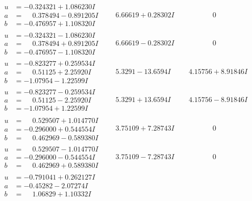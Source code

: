 \documentclass[1p]{elsarticle_modified}
\theoremstyle{definition}
\begin{document}
$$\begin{array}{c|c|c}
\begin{aligned}
u &= -0.324321 + 1.086230 I \\
a &= \phantom{-}0.378494 - 0.891205 I \\
b &= -0.476957 + 1.108320 I\end{aligned}
 & \phantom{-}6.66619 + 0.28302 I & \phantom{-0.000000 } 0 \\ \hline\begin{aligned}
u &= -0.324321 - 1.086230 I \\
a &= \phantom{-}0.378494 + 0.891205 I \\
b &= -0.476957 - 1.108320 I\end{aligned}
 & \phantom{-}6.66619 - 0.28302 I & \phantom{-0.000000 } 0 \\ \hline\begin{aligned}
u &= -0.823277 + 0.259534 I \\
a &= \phantom{-}0.51125 + 2.25920 I \\
b &= -1.07954 - 1.22599 I\end{aligned}
 & \phantom{-}5.3291 - 13.6594 I & \phantom{-}4.15756 + 8.91846 I \\ \hline\begin{aligned}
u &= -0.823277 - 0.259534 I \\
a &= \phantom{-}0.51125 - 2.25920 I \\
b &= -1.07954 + 1.22599 I\end{aligned}
 & \phantom{-}5.3291 + 13.6594 I & \phantom{-}4.15756 - 8.91846 I \\ \hline\begin{aligned}
u &= \phantom{-}0.529507 + 1.014770 I \\
a &= -0.296000 + 0.544554 I \\
b &= \phantom{-}0.462969 - 0.589380 I\end{aligned}
 & \phantom{-}3.75109 + 7.28743 I & \phantom{-0.000000 } 0 \\ \hline\begin{aligned}
u &= \phantom{-}0.529507 - 1.014770 I \\
a &= -0.296000 - 0.544554 I \\
b &= \phantom{-}0.462969 + 0.589380 I\end{aligned}
 & \phantom{-}3.75109 - 7.28743 I & \phantom{-0.000000 } 0 \\ \hline\begin{aligned}
u &= -0.791041 + 0.262127 I \\
a &= -0.45282 - 2.07274 I \\
b &= \phantom{-}1.06829 + 1.10332 I\end{aligned}

\end{array}$$
\end{document}
